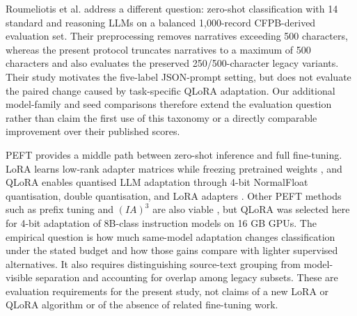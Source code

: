 \documentclass{elektr}
\begin{document}
Roumeliotis et al. \cite{roumeliotis2025think} address a different question: zero-shot classification with 14 standard and reasoning LLMs on a balanced 1,000-record CFPB-derived evaluation set. Their preprocessing removes narratives exceeding 500 characters, whereas the present protocol truncates narratives to a maximum of 500 characters and also evaluates the preserved 250/500-character legacy variants. Their study motivates the five-label JSON-prompt setting, but does not evaluate the paired change caused by task-specific QLoRA adaptation. Our additional model-family and seed comparisons therefore extend the evaluation question rather than claim the first use of this taxonomy or a directly comparable improvement over their published scores.

PEFT provides a middle path between zero-shot inference and full fine-tuning. LoRA learns low-rank adapter matrices while freezing pretrained weights \cite{hu2022lora}, and QLoRA enables quantised LLM adaptation through 4-bit NormalFloat quantisation, double quantisation, and LoRA adapters \cite{dettmers2023qlora}. Other PEFT methods such as prefix tuning and $(IA)^3$ are also viable \cite{li2021prefix,liu2022fewshot}, but QLoRA was selected here for 4-bit adaptation of 8B-class instruction models on 16 GB GPUs. The empirical question is how much same-model adaptation changes classification under the stated budget and how those gains compare with lighter supervised alternatives. It also requires distinguishing source-text grouping from model-visible separation and accounting for overlap among legacy subsets. These are evaluation requirements for the present study, not claims of a new LoRA or QLoRA algorithm or of the absence of related fine-tuning work.
\end{document}
